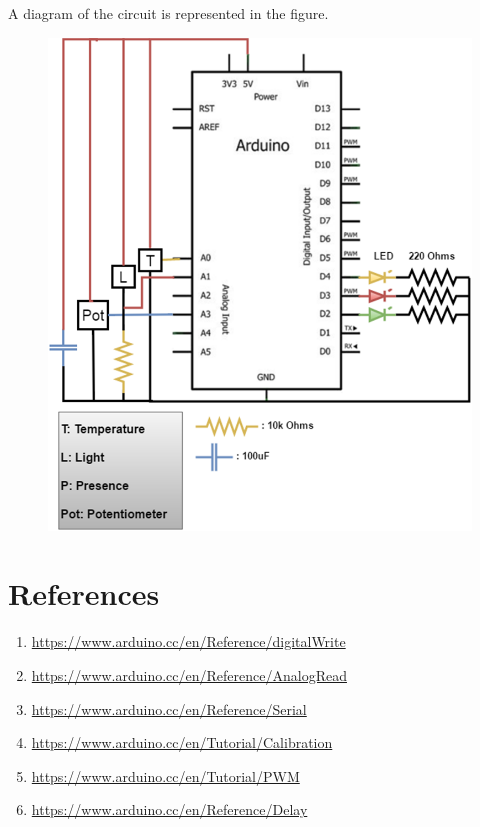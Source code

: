 \documentclass[10pt]{article}
\begin{document}
A diagram of the circuit is represented in the figure.

\begin{figure}[H]
    \centering
    \includegraphics[width=\textwidth]{arduino.png}
\end{figure}

\section{References}

\begin{enumerate}
    \item \url{https://www.arduino.cc/en/Reference/digitalWrite}
    \item \url{https://www.arduino.cc/en/Reference/AnalogRead}
    \item \url{https://www.arduino.cc/en/Reference/Serial}
    \item \url{https://www.arduino.cc/en/Tutorial/Calibration}
    \item \url{https://www.arduino.cc/en/Tutorial/PWM}
    \item \url{https://www.arduino.cc/en/Reference/Delay}
\end{enumerate}
\end{document}
